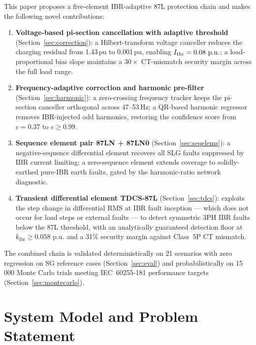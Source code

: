 \documentclass[journal,twoside,10pt]{IEEEtran}
\newcommand{\kibr}{k_{\mathrm{ibr}}}
\newcommand{\pu}{\,\text{p.u.}}
\begin{document}
This paper proposes a five-element IBR-adaptive 87L protection chain and
makes the following novel contributions:
\begin{enumerate}
  \item \textbf{Voltage-based pi-section cancellation with adaptive threshold}
        (Section~\ref{sec:correction}): a Hilbert-transform voltage canceller
        reduces the charging residual from 1.43\,pu to 0.001\,pu, enabling
        $I_{\rm thr} = 0.08\,\pu$; a load-proportional bias slope maintains
        a $30\times$ CT-mismatch security margin across the full load range.
  \item \textbf{Frequency-adaptive correction and harmonic pre-filter}
        (Section~\ref{sec:harmonic}): a zero-crossing frequency tracker
        keeps the pi-section canceller orthogonal across 47--53\,Hz; a
        QR-based harmonic regressor removes IBR-injected odd harmonics,
        restoring the confidence score from $c = 0.37$ to $c \geq 0.99$.
  \item \textbf{Sequence element pair 87LN + 87LN0}
        (Section~\ref{sec:seqelems}): a negative-sequence differential element
        recovers all SLG faults suppressed by IBR current limiting; a
        zero-sequence element extends coverage to solidly-earthed pure-IBR
        earth faults, gated by the harmonic-ratio network diagnostic.
  \item \textbf{Transient differential element TDCS-87L}
        (Section~\ref{sec:tdcs}): exploits the step change in differential
        RMS at IBR fault inception --- which does not occur for load steps
        or external faults --- to detect symmetric 3PH IBR faults below the
        87L threshold, with an analytically guaranteed detection floor at
        $\kibr \geq 0.058\,\pu$ and a 31\% security margin against
        Class~5P CT mismatch.
\end{enumerate}

The combined chain is validated deterministically on 21 scenarios with zero
regression on SG reference cases (Section~\ref{sec:eval}) and
probabilistically on 15\,000 Monte Carlo trials meeting IEC~60255-181
performance targets (Section~\ref{sec:montecarlo}).

\section{System Model and Problem Statement}
\label{sec:model}
\end{document}
